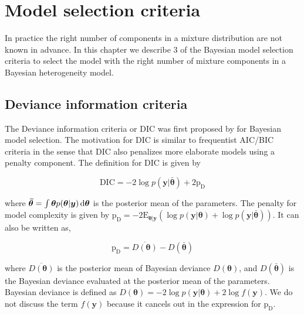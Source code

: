 \chapter{Model selection criteria}
\label{ch : model_selection}

In practice the right number of components in a mixture distribution are not known in advance. In this chapter we describe 3 of the Bayesian model selection criteria to select the model with the right number of mixture components in a Bayesian heterogeneity model.

\section{Deviance information criteria}
\label{sec : dic}

The Deviance information criteria or DIC was first proposed by \citet{spiegelhalter_bayesian_2002} for Bayesian model selection. The motivation for DIC is similar to frequentist AIC/BIC criteria in the sense that DIC also penalizes more elaborate models using a penalty component. The definition for DIC is given by 

$$\text{DIC} = -2\log{p(\boldsymbol{y}|\boldsymbol{\bar{\theta}})} + 2\text{p}_\text{D}$$

where $\boldsymbol{\bar{\theta}} = \int \boldsymbol{\theta} p(\boldsymbol{\theta}|\boldsymbol{y}) \mathop{}\!\mathrm{d}\boldsymbol{\theta}$ is the posterior mean of the parameters. The penalty for model complexity is given by 
$\text{p}_\text{D} = -2\text{E}_{\boldsymbol{\theta}|\boldsymbol{y}}(\log{p(\boldsymbol{y}|\boldsymbol{\theta})} + \log{p(\boldsymbol{y}|\boldsymbol{\bar{\theta}})})$. It can also be written as,

$$\text{p}_\text{D}=\overline{D(\boldsymbol{\theta})} - D(\boldsymbol{\bar{\theta}})$$

where $\overline{D(\boldsymbol{\theta})}$ is the posterior mean of Bayesian deviance $D(\boldsymbol{\theta})$, and $D(\boldsymbol{\bar{\theta}})$ is the Bayesian deviance evaluated at the posterior mean of the parameters. Bayesian deviance is defined as $D(\boldsymbol{\theta}) = -2\log{p(\boldsymbol{y}|\boldsymbol{\theta})} + 2\log{f(\boldsymbol{y})}$. We do not discuss the term $f(\boldsymbol{y})$ because it cancels out in the expression for $\text{p}_\text{D}$.

